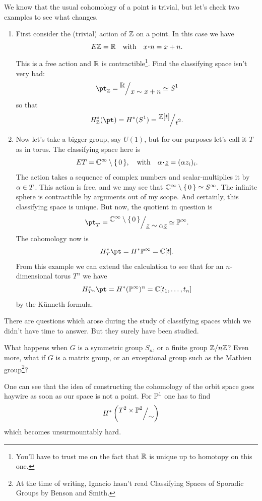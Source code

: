 \documentclass[12pt]{memoir}
\begin{document}
\begin{Ex}
We know that the usual cohomology of a point is trivial, but let's check two examples to see what changes.
\begin{enumerate}
    \item First consider the (trivial) action of $\mathbb{Z}$ on a point. In this case we have
    $$E\bZ=\bR\word{with}x\.n=x+n.$$
    This is a free action and $\mathbb{R}$ is contractible\footnote{You'll have to trust me on the fact that $\mathbb{R}$ is unique up to homotopy on this one.}. Find the classifying space isn't very bad:
    $$\pt_\bZ=\quot{\bR}{x\sim x+n}\isom S^1$$
    so that 
    $$H_\bZ^\ast(\pt)=H^\ast(S^1)=\quot{\bZ[t]}{t^2}.$$
    \item Now let's take a bigger group, say $U(1)$, but for our purposes let's call it $T$ as in torus. The classifying space here is 
    $$ET=\bC^\infty\less\set{0},\word{with}\al\.\un{z}=(\al z_i)_i.$$
    The action takes a sequence of complex numbers and scalar-multiplies it by $\alpha\in T$. 
    This action is free, and we may see that $\mathbb{C}^\infty\setminus\{\,0\,\}\simeq S^\infty$. The infinite sphere is contractible by arguments out of my scope. And certainly, this classifying space is unique. But now, the quotient in question is 
    $$\pt_T=\quot{\bC^\infty\less\set{0}}{\un{z}\sim \al\un{z}}\isom\bP^\infty.$$
    The cohomology now is 
    $$H^\ast_{T}\pt=H^\ast\bP^\infty=\bC[t].$$
    From this example we can extend the calculation to see that for an $n$-dimensional torus $T^n$ we have 
    $$H^\ast_{T^n}\pt=H^\ast(\bP^\infty)^n=\bC[t_1,\dots,t_n]$$
    by the K\"unneth formula.
\end{enumerate}
\end{Ex}

There are questions which arose during the study of classifying spaces which we didn't have time to answer. But they surely have been studied.

\begin{Qn}
    What happens when $G$ is a symmetric group $S_n$, or a finite group $\mathbb{Z}/n\mathbb{Z}$? Even more, what if $G$ is a matrix group, or an exceptional group such as the Mathieu group\footnote{At the time of writing, Ignacio hasn't read Classifying Spaces of Sporadic Groups by Benson and Smith.}?  
\end{Qn}

\begin{Rmk}
    One can see that the idea of constructing the cohomology of the orbit space goes haywire as soon as our space is not a point. For $\mathbb{P}^1$ one has to find
    $$H^\ast\left(\quot{T^2\x\bP^2}{\sim}\right)$$
    which becomes unsurmountably hard.
\end{Rmk}
\end{document}
